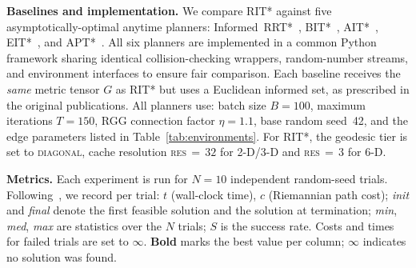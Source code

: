\documentclass[journal]{IEEEtran}
\begin{document}
\begin{table}[t]
\centering
\caption{Experimental environment summary.
  $d$: C-space dimension; $\kappa$: metric condition number;
  $N_{\mathrm{obs}}$: number of obstacles; $\ell_{\max}$: maximum
  edge length; $n_c$: collision checks per edge.}
\label{tab:environments}
\setlength{\tabcolsep}{3pt}
\end{table}

\textbf{Baselines and implementation.}
We compare RIT* against five asymptotically-optimal anytime planners:
Informed~RRT*~\cite{Gammell2018}, BIT*~\cite{Gammell2020},
AIT*~\cite{Strub2022}, EIT*~\cite{Strub2022}, and
APT*~\cite{APT2025}.
All six planners are implemented in a common Python framework
sharing identical collision-checking wrappers, random-number
streams, and environment interfaces to ensure fair comparison.
Each baseline receives the \emph{same} metric tensor $G$ as RIT*
but uses a Euclidean informed set, as prescribed in the original
publications.
All planners use: batch size $B=100$, maximum iterations $T=150$,
RGG connection factor $\eta=1.1$, base random seed~42,
and the edge parameters listed in Table~\ref{tab:environments}.
For RIT*, the geodesic tier is set to \textsc{diagonal},
cache resolution \textsc{res}$\,{=}\,32$ for 2-D/3-D and
\textsc{res}$\,{=}\,3$ for 6-D.

\textbf{Metrics.}
Each experiment is run for $N=10$ independent random-seed trials.
Following~\cite{APT2025}, we record per trial:
$t$ (wall-clock time), $c$ (Riemannian path cost); \emph{init}
and \emph{final} denote the first feasible solution and the
solution at termination; \emph{min}, \emph{med}, \emph{max} are
statistics over the $N$ trials; $S$ is the success rate.
Costs and times for failed trials are set to $\infty$.
\textbf{Bold} marks the best value per column; $\infty$ indicates no
solution was found.
\end{document}

